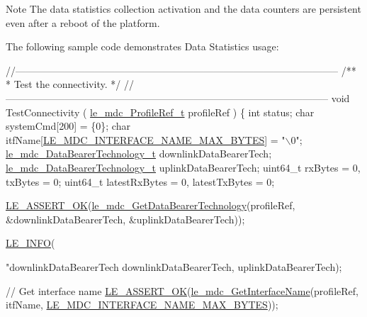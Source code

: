 \begin{DoxyNote}{Note}
The data statistics collection activation and the data counters are persistent even after a reboot of the platform.
\end{DoxyNote}
The following sample code demonstrates Data Statistics usage\+: 
\begin{DoxyCodeInclude}
\textcolor{comment}{//--------------------------------------------------------------------------------------------------}\textcolor{comment}{}
\textcolor{comment}{/**}
\textcolor{comment}{ * Test the connectivity.}
\textcolor{comment}{ */}
\textcolor{comment}{//--------------------------------------------------------------------------------------------------}
\textcolor{keywordtype}{void} TestConnectivity
(
    \hyperlink{le__mdc__interface_8h_a91074d8f0d88c6645e3085dfadf87011}{le\_mdc\_ProfileRef\_t} profileRef
)
\{
    \textcolor{keywordtype}{int} status;
    \textcolor{keywordtype}{char} systemCmd[200] = \{0\};
    \textcolor{keywordtype}{char} itfName[\hyperlink{le__mdc__interface_8h_a33ebf9afd03f0ffc91a80c32c15afb42}{LE\_MDC\_INTERFACE\_NAME\_MAX\_BYTES}] = \textcolor{stringliteral}{"\(\backslash\)0"};
    \hyperlink{le__mdc__interface_8h_a7a9d8c4b2053b048a53257ed810f527e}{le\_mdc\_DataBearerTechnology\_t} downlinkDataBearerTech;
    \hyperlink{le__mdc__interface_8h_a7a9d8c4b2053b048a53257ed810f527e}{le\_mdc\_DataBearerTechnology\_t} uplinkDataBearerTech;
    uint64\_t rxBytes = 0, txBytes = 0;
    uint64\_t latestRxBytes = 0, latestTxBytes = 0;

    \hyperlink{le__log_8h_a7cd2daa3d4af1de4d29e0eed95187484}{LE\_ASSERT\_OK}(\hyperlink{le__mdc__interface_8h_a1b17bb87b347162013b5ad608cdcda2d}{le\_mdc\_GetDataBearerTechnology}(profileRef,
                                                &downlinkDataBearerTech,
                                                &uplinkDataBearerTech));

    \hyperlink{le__log_8h_a23e6d206faa64f612045d688cdde5808}{LE\_INFO}(\textcolor{stringliteral}{"downlinkDataBearerTech %
            downlinkDataBearerTech, uplinkDataBearerTech);

    \textcolor{comment}{// Get interface name}
    \hyperlink{le__log_8h_a7cd2daa3d4af1de4d29e0eed95187484}{LE\_ASSERT\_OK}(\hyperlink{le__mdc__interface_8h_a4c22a8691d6e6a69270a7ed6ab9974af}{le\_mdc\_GetInterfaceName}(profileRef, itfName, 
      \hyperlink{le__mdc__interface_8h_a33ebf9afd03f0ffc91a80c32c15afb42}{LE\_MDC\_INTERFACE\_NAME\_MAX\_BYTES}));

}
\end{DoxyCodeInclude}
